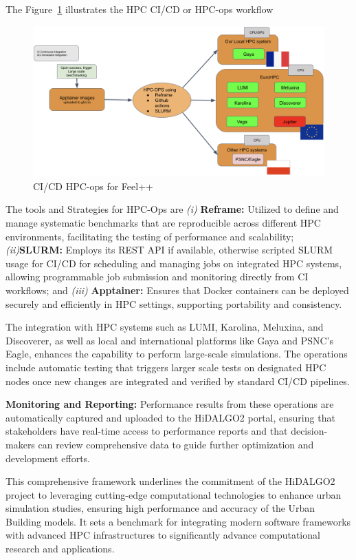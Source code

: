 \documentclass[runningheads]{llncs}
\begin{document}
The Figure~\ref{fig:feelpp-hpcops} illustrates the HPC CI/CD or HPC-ops workflow
\begin{figure}
    \centering
    \includegraphics[width=\textwidth]{images/feelpp-hpcops.png}
    \caption{CI/CD HPC-ops for Feel++}
    \label{fig:feelpp-hpcops}
\end{figure}

The tools and Strategies for HPC-Ops are  \textit{(i) }\textbf{Reframe:} Utilized to define and manage systematic benchmarks that are reproducible across different HPC environments, facilitating the testing of performance and scalability;
\textit{(ii)}\textbf{SLURM:} Employs its REST API if available, otherwise scripted SLURM usage for CI/CD for scheduling and managing jobs on integrated HPC systems, allowing programmable job submission and monitoring directly from CI workflows; and \textit{(iii)} \textbf{Apptainer:} Ensures that Docker containers can be deployed securely and efficiently in HPC settings, supporting portability and consistency.

The integration with HPC systems such as LUMI, Karolina, Meluxina, and Discoverer, as well as local and international platforms like Gaya and PSNC's Eagle, enhances the capability to perform large-scale simulations. The operations include automatic testing that triggers larger scale tests on designated HPC nodes once new changes are integrated and verified by standard CI/CD pipelines.

\textbf{Monitoring and Reporting:}
Performance results from these operations are automatically captured and uploaded to the HiDALGO2 portal, ensuring that stakeholders have real-time access to performance reports and that decision-makers can review comprehensive data to guide further optimization and development efforts.

This comprehensive framework underlines the commitment of the HiDALGO2 project to leveraging cutting-edge computational technologies to enhance urban simulation studies, ensuring high performance and accuracy of the Urban Building models. It sets a benchmark for integrating modern software frameworks with advanced HPC infrastructures to significantly advance computational research and applications.
\end{document}
